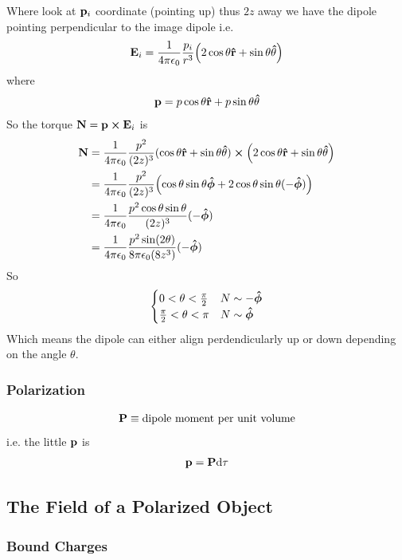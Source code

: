 \documentclass[../main.tex]{subfiles}
\begin{document}
Where look at $\vb p_i$ coordinate (pointing up) thus $2z$ away we have the dipole pointing perpendicular to the image dipole i.e.
\begin{align*}
    \vb E_i = \ke \frac{p_i}{r^3} \qt(
        2\cos\theta \vu r + \sin\theta \vu \theta
    )
\end{align*}
where
\begin{align*}
    \vb p = p\cos\theta \vu r + p\sin\theta \vu \theta
\end{align*}
So the torque $\vb N = \vb p \cross \vb E_i$ is
\begin{align*}
    \vb N &= \ke \frac{p^2}{(2z)^3} (\cos\theta \vu r + \sin\theta \vu \theta) \cross \qt(
        2\cos\theta \vu r + \sin\theta \vu \theta
    ) \\
    &= \ke \frac{p^2}{(2z)^3} \qt(
        \cos\theta \sin\theta \vu*\phi + 2\cos\theta\sin\theta (-\vu*\phi)
        ) \\
    &= \ke \frac{p^2 \cos\theta\sin\theta}{(2z)^3} (-\vu*\phi) \\
    &= \ke \frac{p^2 \sin(2\theta)}{8\pi \epsilon_0 (8z^3)} (-\vu*\phi)
\end{align*}
So
\begin{align*}
    \begin{cases}
        0 < \theta < \frac{\pi}{2} & N\sim -\vu*\phi \\
        \frac{\pi}{2} < \theta < \pi & N\sim \vu*\phi
    \end{cases}
\end{align*}
Which means the dipole can either align perdendicularly up or down depending on the angle $\theta$.

\subsubsection{Polarization}
\begin{align*}
    \vb P \equiv \textrm{dipole moment per unit volume}
\end{align*}
i.e. the little $\vb p$ is
\begin{align*}
    \vb p = \vb P \dd\tau
\end{align*}

\subsection{The Field of a Polarized Object}
\subsubsection{Bound Charges}
\end{document}
